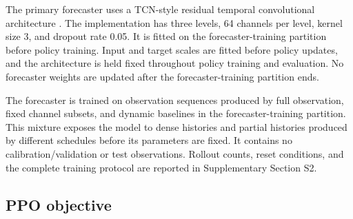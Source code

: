 The primary forecaster uses a TCN-style residual temporal convolutional
architecture \citep{Bai2018}. The implementation has three levels, 64 channels
per level, kernel size 3, and dropout rate 0.05. It is
fitted on the forecaster-training partition before policy training. Input and
target scales are fitted before policy updates, and the architecture is held
fixed throughout policy training and evaluation. No forecaster weights are
updated after the forecaster-training partition ends.

The forecaster is trained on observation sequences produced by full observation,
fixed channel subsets, and dynamic baselines in the forecaster-training
partition. This mixture exposes the model to dense histories and partial
histories produced by different schedules before its parameters are fixed. It
contains no calibration/validation or test observations.
Rollout counts, reset conditions, and the complete
training protocol are reported in Supplementary Section S2.

\subsection{PPO objective}

